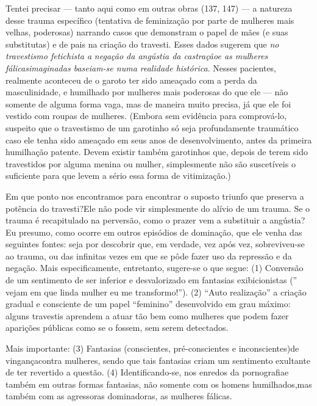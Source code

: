 Tentei precisar --- tanto aqui como em outras obras (137, 147) ---
a natureza desse trauma específico (tentativa de feminização por parte
de mulheres mais velhas, poderosas) narrando casos que demonstram o
papel de mães (e suas substitutas) e de pais\idxrelpctrav{} na criação do travesti.
Esses dados sugerem que \textit{no travestismo fetichista a}
\textit{negação da angústia da castração\idxtravemangu[|(] e as mulheres fálicas\idxmulhf[|(]
imaginadas baseiam-se numa realidade histórica}. Nesses pacientes,
realmente aconteceu de o garoto ter sido ameaçado com a perda da
masculinidade, e humilhado por mulheres mais poderosas do que ele ---
não somente de alguma forma vaga, mas de maneira muito precisa, já que
ele foi vestido com roupas de mulheres. (Embora sem evidência para
comprová-lo, suspeito que o travestismo de um garotinho só seja
profundamente traumático caso ele tenha sido ameaçado em seus anos de
desenvolvimento, antes da primeira humilhação patente. Devem existir
também garotinhos que, depois de terem sido travestidos por alguma
menina ou mulher, simplesmente não são suscetíveis o suficiente para
que levem a sério essa forma de vitimização.)\idxpornoviti[|(]

Em que ponto nos encontramos para encontrar o suposto triunfo\idxtraumatrav{} que
preserva a potência do travesti?\idxtravempote[|(] Ele não pode vir simplesmente do
alívio de um trauma. Se o trauma é recapitulado na perversão, como o
prazer vem a substituir a angústia? Eu presumo, como ocorre em outros
episódios de dominação, que ele venha das seguintes fontes: seja por
descobrir que, em verdade, vez após vez, sobreviveu-se ao trauma, ou
das infinitas vezes em que se pôde fazer uso da repressão e da negação.
Mais especificamente, entretanto, sugere-se o que segue: (1) Conversão
de um sentimento de ser inferior e desvalorizado em fantasias
exibicionistas\idxexibitrav{} ('' vejam em que linda mulher eu me
transformo!''). (2) ``Auto
realização''\idxtravemauto{} a criação gradual e consciente de um papel
``feminino'' desenvolvido em grau máximo:
alguns travestis aprendem a atuar tão bem como mulheres que podem fazer
aparições públicas como se o fossem, sem serem detectados.

Mais importante: (3) Fantasias (conscientes, pré-conscientes e
inconscientes)\idxtravemving[|(] de vingança\idxvingatra[|(] contra mulheres, sendo que tais fantasias
criam um sentimento exultante de ter revertido a questão. (4)
Identificando-se, nos enredos da pornografia\idxpornofant[|(] e também em outras formas
fantasias, não somente com os homens humilhados,\idxtravetrau[|)] mas também com as
agressoras dominadoras, as mulheres fálicas.

